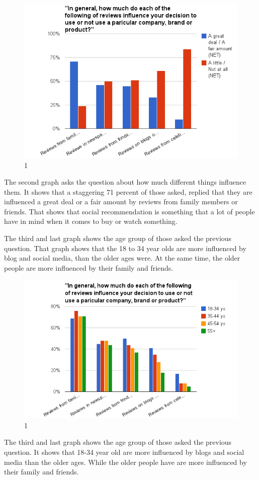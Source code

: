 \begin{figure}[htb]
\centering
\includegraphics[width=1\textwidth]{Images/teori2.png}
\caption{1}
\label{Teori2}
\end{figure}

The second graph asks the question about how much different things influence them. It shows that a staggering 71 percent of those asked, replied that they are influenced a great deal or a fair amount by reviews from family members or friends. That shows that social recommendation is something that a lot of people have in mind when it comes to buy or watch something.

The third and last graph shows the age group of those asked the previous question. That graph shows that the 18 to 34 year olds are more influenced by blog and social media, than the older ages were. At the same time, the older people are more influenced by their family and friends.

\begin{figure}[htb]
\centering
\includegraphics[width=1\textwidth]{Images/teori3.png}
\caption{1}
\label{Teori3}
\end{figure}

The third and last graph shows the age group of those asked the previous question. It shows that 18-34 year old are more influenced by blogs and social media than the older ages. While the older people have are more influenced by their family and friends.